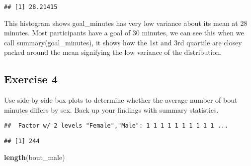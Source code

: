 \documentclass[]{article}
\newenvironment{Shaded}{\begin{snugshade}}{\end{snugshade}}
\newcommand{\KeywordTok}[1]{\textcolor[rgb]{0.13,0.29,0.53}{\textbf{#1}}}
\newcommand{\StringTok}[1]{\textcolor[rgb]{0.31,0.60,0.02}{#1}}
\newcommand{\OperatorTok}[1]{\textcolor[rgb]{0.81,0.36,0.00}{\textbf{#1}}}
\newcommand{\NormalTok}[1]{#1}
\begin{document}
\begin{verbatim}
## [1] 28.21415
\end{verbatim}

This histogram shows goal\_minutes has very low variance about its mean
at 28 minutes. Most participants have a goal of 30 minutes, we can see
this when we call summary(goal\_minutes), it shows how the 1st and 3rd
quartile are closey packed around the mean signifying the low variance
of the distribution.

\subsection{Exercise 4}\label{exercise-4}

Use side-by-side box plots to determine whether the average number of
bout minutes differs by sex. Back up your findings with summary
statistics.

\begin{Shaded}
\end{Shaded}

\begin{verbatim}
##  Factor w/ 2 levels "Female","Male": 1 1 1 1 1 1 1 1 1 1 ...
\end{verbatim}

\begin{Shaded}
\end{Shaded}

\begin{verbatim}
## [1] 244
\end{verbatim}

\begin{Shaded}
\begin{Highlighting}[]
\KeywordTok{length}\NormalTok{(bout_male)}
\end{Highlighting}
\end{Shaded}
\end{document}
